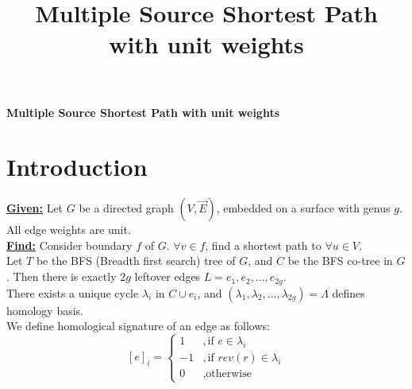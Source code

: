 \documentclass{article}
\begin{document}
\title{Multiple Source Shortest Path with unit weights}

\begin{center}
\textbf{\large Multiple Source Shortest Path with unit weights}
\end{center}

\section{Introduction}

\textbf{\underline{Given:}} Let $G$ be a directed graph $(V, \vec{E})$, embedded on a surface with genus $g$. All edge weights are unit. \\
\textbf{\underline{Find:}} Consider boundary $f$ of $G$. $\forall v \in f$, find a shortest path to $\forall u \in V$. \\

Let $T$ be the BFS (Breadth first search) tree of $G$, and $C$ be the BFS co-tree in $G$. Then there is exactly $2g$ leftover edges $L = {e_1, e_2, \ldots, e_{2g}}$. \\
There exists a unique cycle $\lambda_i$ in $C \cup {e_i}$, and $(\lambda_1, \lambda_2, \ldots, \lambda_{2g}) = \Lambda$ defines homology basis. \\
We define homological signature of an edge as follows:
\[ [e]_{i} = \begin{cases} 1 & ,\mbox{if } e \in \lambda_i \\
                          -1 & ,\mbox{if } rev(r) \in \lambda_i \\
                           0 & ,\mbox{otherwise} \end{cases}\]
\end{document}
